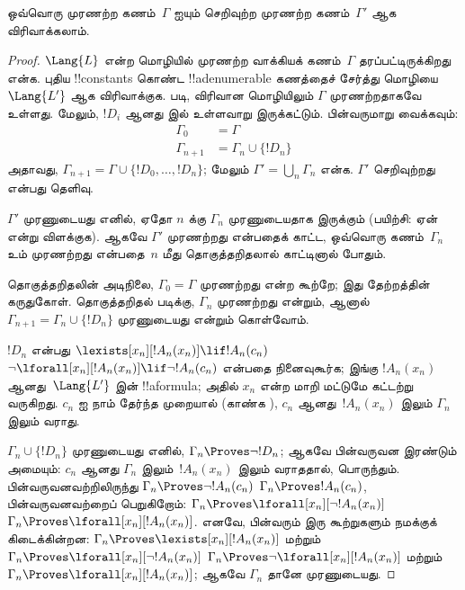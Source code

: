 \documentclass[../../../include/open-logic-section]{subfiles}
\begin{document}
\begin{lem}
ஒவ்வொரு முரணற்ற கணம்~$\Gamma$ ஐயும் செறிவுற்ற முரணற்ற கணம்~$\Gamma'$ ஆக
விரிவாக்கலாம்.
\end{lem}

\begin{proof}
$\Lang{L}$ என்ற மொழியில் முரணற்ற வாக்கியக் கணம்~$\Gamma$ தரப்பட்டிருக்கிறது
என்க. புதிய !!{constant}s கொண்ட !!a{denumerable} கணத்தைச் சேர்த்து
மொழியை~$\Lang{L'}$ ஆக விரிவாக்குக.  படி, விரிவான
மொழியிலும் $\Gamma$ முரணற்றதாகவே உள்ளது. மேலும், $!D_i$ ஆனது
 இல் உள்ளவாறு இருக்கட்டும். பின்வருமாறு வைக்கவும்:
\begin{align*}
\Gamma_0 & = \Gamma \\
\Gamma_{n+1} & = \Gamma_n \cup \{!D_n \}
\end{align*}
அதாவது, $\Gamma_{n+1} = \Gamma \cup \{ !D_0, \dots, !D_n \}$; மேலும்
$\Gamma' = \bigcup_{n} \Gamma_n$ என்க. $\Gamma'$ செறிவுற்றது என்பது
தெளிவு.

$\Gamma'$ முரணுடையது எனில், ஏதோ $n$ க்கு $\Gamma_n$ முரணுடையதாக இருக்கும்
(பயிற்சி: ஏன் என்று விளக்குக). ஆகவே $\Gamma'$ முரணற்றது என்பதைக் காட்ட,
ஒவ்வொரு கணம்~$\Gamma_n$ உம் முரணற்றது என்பதை~$n$ மீது தொகுத்தறிதலால்
காட்டினால் போதும்.

தொகுத்தறிதலின் அடிநிலை, $\Gamma_0 = \Gamma$ முரணற்றது என்ற கூற்றே; இது
தேற்றத்தின் கருதுகோள். தொகுத்தறிதல் படிக்கு, $\Gamma_{n}$ முரணற்றது என்றும்,
ஆனால் $\Gamma_{n+1} = \Gamma_n \cup \{!D_n\}$ முரணுடையது என்றும் கொள்வோம்.

$!D_n$ என்பது
{$\lexists[x_{n}][!A_{n}(x_n)] \lif !A_{n}(c_{n})$}
{$\lnot\lforall[x_{n}][!A_{n}(x_n)] \lif \lnot !A_{n}(c_{n})$}
என்பதை நினைவுகூர்க; இங்கு $!A_n(x_n)$ ஆனது~$\Lang{L'}$ இன் !!a{formula};
அதில் $x_n$ என்ற மாறி மட்டுமே கட்டற்று வருகிறது. $c_n$ ஐ நாம் தேர்ந்த
முறையால் (காண்க ), $c_n$ ஆனது~$!A_n(x_n)$ இலும்
$\Gamma_n$ இலும் வராது.

$\Gamma_n \cup \{!D_n\}$ முரணுடையது எனில், $\Gamma_n
\Proves \lnot !D_n$; ஆகவே பின்வருவன இரண்டும் அமையும்:
$c_n$ ஆனது $\Gamma_n$ இலும்~$!A_n(x_n)$ இலும் வராததால்,
பொருந்தும். பின்வருவனவற்றிலிருந்து
{$\Gamma_n \Proves \lnot !A_n(c_n)$}
{$\Gamma_n \Proves !A_n(c_n)$},
பின்வருவனவற்றைப் பெறுகிறோம்:
{$\Gamma_n \Proves \lforall[x_n][\lnot !A_n(x_n)]$}
{$\Gamma_n \Proves \lforall[x_n][!A_n(x_n)]$}.
எனவே, பின்வரும் இரு கூற்றுகளும் நமக்குக் கிடைக்கின்றன:
{$\Gamma_n \Proves \lexists[x_n][!A_n(x_n)]$ மற்றும்
$\Gamma_n \Proves \lforall[x_n][\lnot !A_n(x_n)]$}
{$\Gamma_n \Proves \lnot\lforall[x_n][!A_n(x_n)]$ மற்றும்
$\Gamma_n \Proves \lforall[x_n][!A_n(x_n)]$};
ஆகவே $\Gamma_n$ தானே முரணுடையது.


\end{proof}
\end{document}
